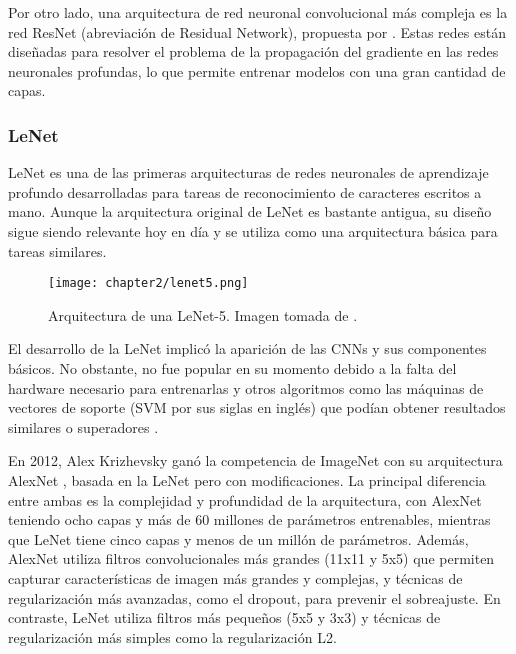 Por otro lado, una arquitectura de red neuronal convolucional más compleja es la red ResNet (abreviación de Residual
Network), propuesta por \cite{he2016deep}. Estas redes están diseñadas para resolver el problema de la propagación del
gradiente en las redes neuronales profundas, lo que permite entrenar modelos con una gran cantidad de capas.

\subsubsection{LeNet}
LeNet es una de las primeras arquitecturas de redes neuronales de aprendizaje profundo desarrolladas para tareas de
reconocimiento de caracteres escritos a mano. Aunque la arquitectura original de LeNet es bastante antigua, su diseño
sigue siendo relevante hoy en día y se utiliza como una arquitectura básica para tareas similares.

\begin{figure}[H]
  \centering
  \texttt{[image: chapter2/lenet5.png]}

  \caption[Arquitectura de una LeNet-5]{Arquitectura de una LeNet-5. Imagen tomada de \cite{lecun1998gradient}.}
  \label{fig:lenet}
\end{figure}

El desarrollo de la LeNet implicó la aparición de las CNNs y sus componentes básicos. No obstante, no fue popular en su
momento debido a la falta del hardware necesario para entrenarlas y otros algoritmos como las máquinas de vectores de
soporte (SVM por sus siglas en inglés) que podían obtener resultados similares o superadores \parencite{lecun1998gradient, decoste2002training, lauer2007trainable}.

En 2012, Alex Krizhevsky ganó la competencia de ImageNet con su arquitectura AlexNet \parencite{krizhevsky2017imagenet}, basada en la LeNet pero con modificaciones. La principal diferencia entre ambas es la
complejidad y profundidad de la arquitectura, con AlexNet teniendo ocho capas y más de 60 millones de parámetros
entrenables, mientras que LeNet tiene cinco capas y menos de un millón de parámetros. Además, AlexNet utiliza filtros
convolucionales más grandes (11x11 y 5x5) que permiten capturar características de imagen más grandes y complejas, y
técnicas de regularización más avanzadas, como el dropout, para prevenir el sobreajuste. En contraste, LeNet utiliza
filtros más pequeños (5x5 y 3x3) y técnicas de regularización más simples como la regularización L2.

